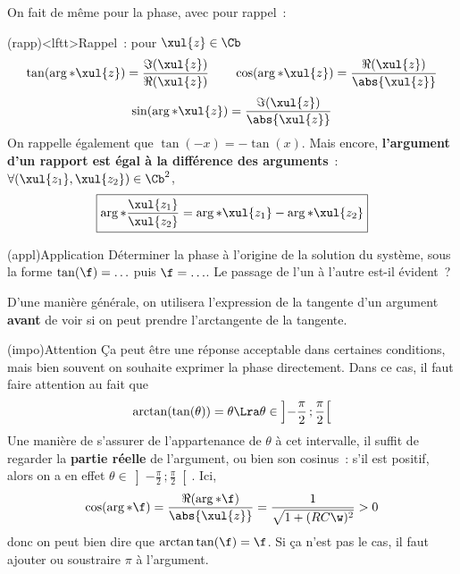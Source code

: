 \documentclass[../../main/main.tex]{subfiles}
\begin{document}
On fait de même pour la phase, avec pour rappel~:
\begin{tcb}[sidebyside](rapp)<lftt>{Rappel~: pour $\xul{z} \in \Cb$}
	\[\tan(\arg*{\xul{z}}) = \frac{\Im(\xul{z})}{\Re(\xul{z})}
		\qquad
		\cos(\arg*{\xul{z}}) = \frac{\Re(\xul{z})}{\abs{\xul{z}}}
	\]
	\[
		\qquad
		\sin(\arg*{\xul{z}}) = \frac{\Im(\xul{z})}{\abs{\xul{z}}}
		\qquad
	\]
	On rappelle également que $\tan(-x) = -\tan(x)$.
	\tcblower
	Mais encore,
	\textbf{l'argument d'un rapport est égal à la différence des arguments}~:
	$\forall (\xul{z_1}, \xul{z_2}) \in \Cb^2$,
	\[
		\boxed{
			\arg*{ \frac{\xul{z_1}}{\xul{z_2}} } =
			\arg*{\xul{z_1}} - \arg*{\xul{z_2}}
		}
	\]
\end{tcb}
\begin{tcb}(appl){Application}
	Déterminer la phase à l'origine de la solution du système, sous la forme
	$\tan(\f) = \ldots$ puis $\f = \ldots$. Le passage de l'un à l'autre est-il
	évident~?
	\tcblower
\end{tcb}
D'une manière générale, on utilisera l'expression de la tangente d'un
argument \textbf{avant} de voir si on peut prendre l'arctangente de la
tangente.
\begin{tcb}(impo){Attention}
	Ça peut être une réponse acceptable dans certaines conditions, mais bien souvent
	on souhaite exprimer la phase directement. Dans ce cas, il faut faire attention
	au fait que
	\[
	\arctan(\tan(\theta)) = \theta
	\Lra
	\theta \in \left] - \frac{\pi}{2}\,; \frac{\pi}{2} \right[
		\]
		Une manière de s'assurer de l'appartenance de $\theta$ à cet intervalle, il
		suffit de regarder la \textbf{partie réelle} de l'argument, ou bien son
		cosinus~: s'il est positif, alors on a en effet $\theta \in \left] -
	\frac{\pi}{2}\,; \frac{\pi}{2} \right[$. Ici,
		\begin{gather*}
			\cos(\arg*{\f})
			= \frac{\Re(\arg*{\f})}{\abs{\xul{z}}}
			= \frac{1}{\sqrt{1 + (RC\w)^2}} > 0
		\end{gather*}
		donc on peut bien dire que $\arctan\tan(\f) = \f$.
		\smallbreak
		Si ça n'est pas le cas, il faut ajouter ou soustraire $\pi$ à l'argument.
\end{tcb}
\end{document}
